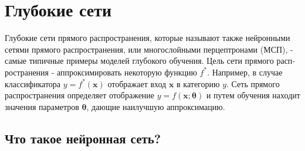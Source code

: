 






\section{Глубокие сети}

Глубокие сети прямого распространения, которые называют также нейронными
сетями прямого распространения, или многослойными перцептронами (МСП), -
самые типичные примеры моделей глубокого обучения. Цель сети прямого расп­рост­ранения 
- аппроксимировать некоторую функцию $f^*$. Например, в случае классификатора 
$y = f^*(\bm{x})$ отображает вход $\bm{x}$ в категорию $y$. Сеть прямого распространения
определяет отображение $y = f(\bm{x}; \bm{\theta})$ и путем обучения находит 
значения параметров $\bm{\theta}$, дающие наилучшую аппроксимацию.


\subsection{Что такое нейронная сеть?}

